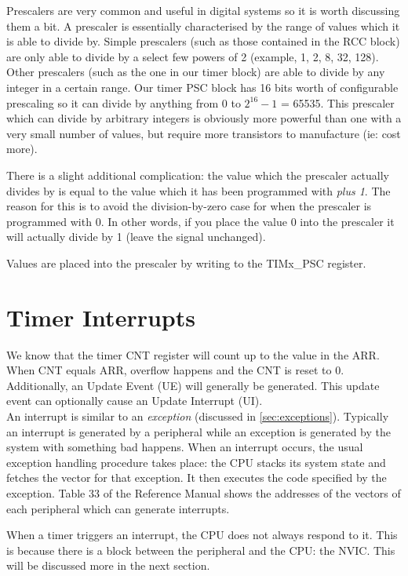 Prescalers are very common and useful in digital systems so it is worth discussing them a bit. A prescaler is essentially characterised by the range of values which it is able to divide by. Simple prescalers (such as those contained in the RCC block) are only able to divide by a select few powers of 2 (example, 1, 2, 8, 32, 128). Other prescalers (such as the one in our timer block) are able to divide by any integer in a certain range. Our timer PSC block has 16 bits worth of configurable prescaling so it can divide by anything from 0 to $2^{16} - 1$ = 65535. This prescaler which can divide by arbitrary integers is obviously more powerful than one with a very small number of values, but require more transistors to manufacture (ie: cost more). 

There is a slight additional complication: the value which the prescaler actually divides by is equal to the value which it has been programmed with \emph{plus 1}. The reason for this is to avoid the division-by-zero case for when the prescaler is programmed with 0. In other words, if you place the value 0 into the prescaler it will actually divide by 1 (leave the signal unchanged). 

Values are placed into the prescaler by writing to the TIMx\_PSC register.

\section{Timer Interrupts}
We know that the timer CNT register will count up to the value in the ARR. 
When CNT equals ARR, overflow happens and the CNT is reset to 0. 
Additionally, an Update Event (UE) will generally be generated. 
This update event can optionally cause an Update Interrupt (UI).\\

An interrupt is similar to an \emph{exception} (discussed in \autoref{sec:exceptions}). Typically an interrupt is generated by a peripheral while an exception is generated by the system with something bad happens. When an interrupt occurs, the usual exception handling procedure takes place: the CPU stacks its system state and fetches the vector for that exception. It then executes the code specified by the exception. Table 33 of the Reference Manual shows the addresses of the vectors of each peripheral which can generate interrupts. 

When a timer triggers an interrupt, the CPU does not always respond to it. This is because there is a block between the peripheral and the CPU: the NVIC. This will be discussed more in the next section.


